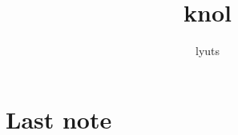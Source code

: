\documentclass{book}
\begin{document}
\frontmatter

\author{lyuts}
\title{knol}

\maketitle


\mainmatter




\appendix


\backmatter
\chapter{Last note}
\end{document}
